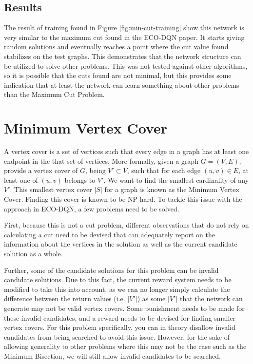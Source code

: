 \documentclass{article}
\begin{document}
\subsection{Results}\label{sec:results-min-cut}

The result of training found in Figure \ref{fig:min-cut-training} show this network is very similar to the maximum cut found in the ECO-DQN paper. It starts giving random solutions and eventually reaches a point where the cut value found stabilizes on the test graphs. This demonstrates that the network structure can be utilized to solve other problems. This was not tested against other algorithms, so it is possible that the cuts found are not minimal, but this provides some indication that at least the network can learn something about other problems than the Maximum Cut Problem. 


\section{Minimum Vertex Cover}\label{sec:mvc}

A vertex cover is a set of vertices such that every edge in a graph has at least one endpoint in the that set of vertices. More formally, given a graph $G = (V, E)$, provide a vertex cover of $G$, being $V' \subset V$, such that for each edge $(u, v) \in E$, at least one of $(u, v)$ belongs to $V'$. We want to find the smallest cardinality of any $V'$. This smallest vertex cover $|S|$ for a graph is known as the Minimum Vertex Cover. Finding this cover is known to be NP-hard. To tackle this issue with the approach in ECO-DQN, a few problems need to be solved.

First, because this is not a cut problem, different observations that do not rely on calculating a cut need to be devised that can adequately report on the information about the vertices in the solution as well as the current candidate solution as a whole. 

Further, some of the candidate solutions for this problem can be invalid candidate solutions. Due to this fact, the current reward system needs to be modified to take this into account, as we can no longer simply calculate the difference between the return values (i.e. $|V'|$) as some $|V'|$ that the network can generate may not be valid vertex covers. Some punishment needs to be made for these invalid candidates, and a reward needs to be devised for finding smaller vertex covers. For this problem specifically, you can in theory disallow invalid candidates from being searched to avoid this issue. However, for the sake of allowing generality to other problems where this may not be the case such as the Minimum Bisection, we will still allow invalid candidates to be searched. 
\end{document}
